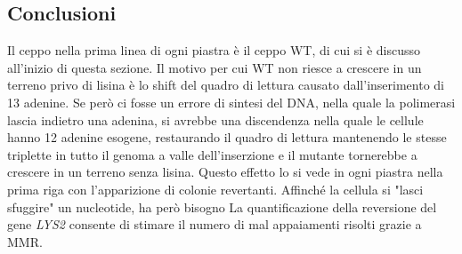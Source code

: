  \subsection{Conclusioni}
 Il ceppo nella prima linea di ogni piastra è il ceppo WT, di cui si è discusso all'inizio di questa sezione. Il motivo per cui WT non riesce a crescere in un terreno privo di lisina è lo shift del quadro di lettura causato dall'inserimento di 13 adenine. Se però ci fosse un errore di sintesi del DNA, nella quale la polimerasi lascia indietro una adenina, si avrebbe una discendenza nella quale le cellule hanno 12 adenine esogene, restaurando il quadro di lettura mantenendo le stesse triplette in tutto il genoma a valle dell'inserzione e il mutante tornerebbe a crescere in un terreno senza lisina. Questo effetto lo si vede in ogni piastra nella prima riga con l'apparizione di colonie revertanti. Affinché la cellula si "lasci sfuggire" un nucleotide, ha però bisogno La quantificazione della reversione del gene \textit{LYS2} consente di stimare il numero di mal appaiamenti risolti grazie a MMR.
 
 
 
 
 
 
 
 
 
 
 